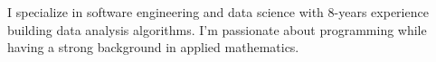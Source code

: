 \begin{cventries}
    \begin{flushleft}
        \bodyfont
        I specialize in software engineering and data science with 8-years
        experience building data analysis algorithms.
        I'm passionate about programming while having a strong background in applied mathematics.
    \end{flushleft}
\end{cventries}
